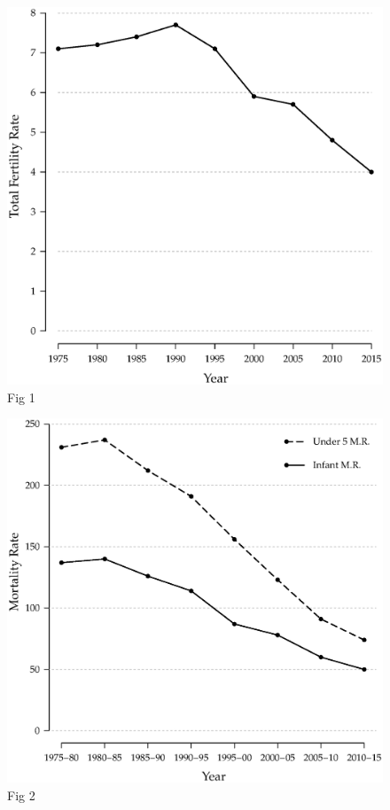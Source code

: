 \documentclass[a4paper, twocolumn]{article}
\begin{document}
\lipsum[1]

\begin{figure}[!hbtp]
\includegraphics[width = \columnwidth]{../figures/fig1.eps}
\caption{Fig 1}
\end{figure}

\lipsum[1]

\begin{figure}[!hbtp]
\includegraphics[width = \columnwidth]{../figures/fig2.eps}
\caption{Fig 2}
\end{figure}
\end{document}
